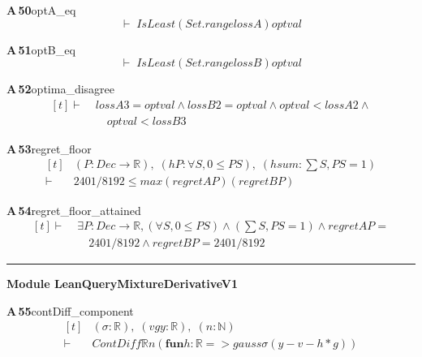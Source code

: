 \documentclass[conference]{IEEEtran}
\theoremstyle{definition}
\newcommand{\lean}[1]{\textsf{\footnotesize #1}}
\begin{document}
\noindent\textbf{A\,50}\quad\lean{optA\_eq}
{\footnotesize\[ \vdash\; \mathit{IsLeast} (\mathit{Set}.\mathit{range} \mathit{lossA}) \mathit{optval} \]}

\noindent\textbf{A\,51}\quad\lean{optB\_eq}
{\footnotesize\[ \vdash\; \mathit{IsLeast} (\mathit{Set}.\mathit{range} \mathit{lossB}) \mathit{optval} \]}

\noindent\textbf{A\,52}\quad\lean{optima\_disagree}
{\footnotesize\[ \begin{aligned}[t]
\vdash\;&\mathit{lossA} 3 = \mathit{optval} \wedge \mathit{lossB} 2 = \mathit{optval} \wedge \mathit{optval} < \mathit{lossA} 2 \wedge\\
&\quad \mathit{optval} < \mathit{lossB} 3
\end{aligned} \]}

\noindent\textbf{A\,53}\quad\lean{regret\_floor}
{\footnotesize\[ \begin{aligned}[t]
&(\mathit{P} : \mathit{Dec} \to \mathbb{R} ),\; (\mathit{hP} : \forall \mathit{S}, 0 \leq \mathit{P} \mathit{S}),\; (\mathit{hsum} : \textstyle\sum \mathit{S}, \mathit{P} \mathit{S} = 1)\\
\vdash\;&2401/8192 \leq \mathit{max} (\mathit{regretA} \mathit{P}) (\mathit{regretB} \mathit{P})
\end{aligned} \]}

\noindent\textbf{A\,54}\quad\lean{regret\_floor\_attained}
{\footnotesize\[ \begin{aligned}[t]
\vdash\;&\exists \mathit{P} : \mathit{Dec} \to \mathbb{R} , (\forall \mathit{S}, 0 \leq \mathit{P} \mathit{S}) \wedge (\textstyle\sum \mathit{S}, \mathit{P} \mathit{S} = 1) \wedge \mathit{regretA} \mathit{P} =\\
&\quad 2401/8192 \wedge \mathit{regretB} \mathit{P} = 2401/8192
\end{aligned} \]}

\vspace{4pt}\noindent\rule{\columnwidth}{0.4pt}\par\vspace{2pt}
\noindent\textbf{Module \lean{LeanQueryMixtureDerivativeV1}}\par\vspace{3pt}

\noindent\textbf{A\,55}\quad\lean{contDiff\_component}
{\footnotesize\[ \begin{aligned}[t]
&(\sigma : \mathbb{R} ),\; (\mathit{v} \mathit{g} \mathit{y} : \mathbb{R} ),\; (\mathit{n} : \mathbb{N} )\\
\vdash\;&\mathit{ContDiff} \mathbb{R} \mathit{n} (\mathbf{fun} \mathit{h} : \mathbb{R} => \mathit{gauss} \sigma (\mathit{y} - \mathit{v} - \mathit{h} * \mathit{g}))
\end{aligned} \]}
\end{document}
